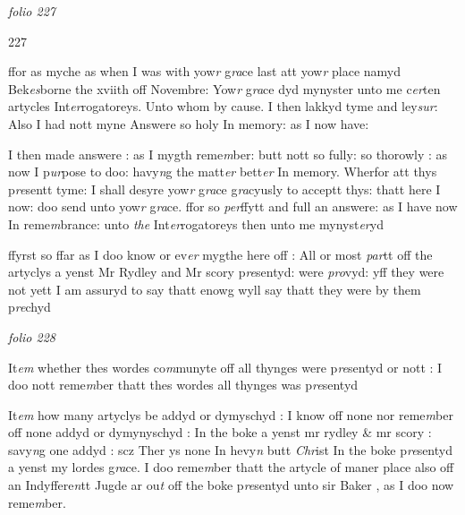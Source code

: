 \documentclass[12pt, a4paper]{book}
\begin{document}
\textit{folio 227}



\begin{flushright}{\color{Mahogany}227}\end{flushright}
            		
		\ifthenelse{\isodd{\thepage}}
		{\reversemarginpar}
		{\normalmarginpar}
		ffor as myche as when I was with yow\textit{r} g\textit{ra}ce last att yow\textit{r} place
            			namyd Bek\textit{es}borne the xviith off Novembre: Yow\textit{r} g\textit{ra}ce dyd
mynyster unto me c\textit{er}ten artycles Int\textit{er}rogatoreys. Unto whom
by cause. I then lakkyd tyme and ley\textit{sur}: Also I had nott
myne Answere so holy In memory: as I now have: 

		\ifthenelse{\isodd{\thepage}}
		{\reversemarginpar}
		{\normalmarginpar}
		I then made answere : as I mygth reme\textit{m}ber: butt nott 
so fully: so thorowly : as now I p\textit{ur}pose to doo: havy\textit{n}g
the matt\textit{er} bett\textit{er} In memory. Wherfor att thys p\textit{re}sentt
	tyme: I shall desyre yow\textit{r} g\textit{ra}ce g\textit{ra}cyusly to acceptt
	thys: thatt here I now: doo send unto yow\textit{r} g\textit{ra}ce. ffor
so \textit{per}ffytt and full an answere: as I have now In
reme\textit{m}brance: unto \textit{the }Int\textit{er}rogatoreys then unto me mynyst\textit{er}yd

		\ifthenelse{\isodd{\thepage}}
		{\reversemarginpar}
		{\normalmarginpar}
		ffyrst so ffar as I doo know or ev\textit{er} mygthe here off : All 
or most \textit{par}tt off the artyclys a yenst Mr Rydley and Mr 
scory p\textit{re}sentyd: were \textit{pro}vyd: yff they were not yett I am
assuryd
			 to say thatt enowg wyll say thatt they were by them
			 p\textit{re}chyd

\dotfill
						\newpage
{}

\textit{folio 228}



		\ifthenelse{\isodd{\thepage}}
		{\reversemarginpar}
		{\normalmarginpar}
		It\textit{em} whether thes wordes co\textit{m}munyte off all thynges were p\textit{re}sentyd or
nott : I doo nott reme\textit{m}ber thatt thes wordes all thynges was p\textit{re}sentyd

		\ifthenelse{\isodd{\thepage}}
		{\reversemarginpar}
		{\normalmarginpar}
		It\textit{em} how many artyclys be addyd or dymyschyd : I know off none nor
	reme\textit{m}ber off none addyd or dymynyschyd : In the boke a yenst mr 
rydley \& mr scory : savy\textit{n}g one addyd : scz Ther ys none In hevy\textit{n} butt \textit{Chr}ist
In the boke p\textit{re}sentyd a yenst my lordes g\textit{ra}ce. I doo reme\textit{m}ber thatt the
artycle of maner place also off an
			 Indyffere\textit{n}tt Jugde ar ou\textit{t} off the boke
	p\textit{re}sentyd unto sir Baker
			, as I doo now reme\textit{m}ber. 
\end{document}
